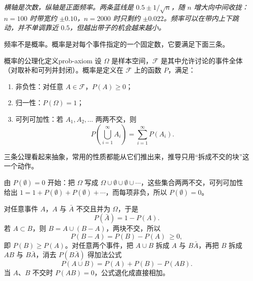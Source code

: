 \begin{center}
\par\vspace{2pt}
{\footnotesize\itshape 横轴是次数，纵轴是正面频率。两条蓝线是 $0.5\pm1/\sqrt n$，随 $n$ 增大向中间收拢：$n=100$ 时带宽约 $\pm0.10$，$n=2000$ 时只剩约 $\pm0.022$。频率可以在带内上下跳动，并不单调靠近 $0.5$，但越出带子的机会越来越小。}
\end{center}

频率不是概率。概率是对每个事件指定的一个固定数，它要满足下面三条。

\begin{mydef}{概率的公理化定义}{prob-axiom}
设 $\Omega$ 是样本空间，$\mathcal F$ 是其中允许讨论的事件全体（对取补和可列并封闭）。概率是定义在 $\mathcal F$ 上的函数 $P$，满足：
\begin{enumerate}[label=(\roman*),leftmargin=2.2em]
\item 非负性：对任意 $A\in\mathcal F$，$P(A)\ge 0$；
\item 归一性：$P(\Omega)=1$；
\item 可列可加性：若 $A_1,A_2,\dots$ 两两不交，则
\[
P\!\left(\bigcup_{i=1}^{\infty}A_i\right)=\sum_{i=1}^{\infty}P(A_i).
\]
\end{enumerate}
\end{mydef}

三条公理看起来抽象，常用的性质都能从它们推出来，推导只用“拆成不交的块”这一个动作。

由 $P(\emptyset)=0$ 开始：把 $\Omega$ 写成 $\Omega\cup\emptyset\cup\emptyset\cup\cdots$，这些集合两两不交，可列可加性给出 $1=1+P(\emptyset)+P(\emptyset)+\cdots$，而每项非负，所以 $P(\emptyset)=0$。

对任意事件 $A$，$A$ 与 $\bar A$ 不交且并为 $\Omega$，于是
\[
P(\bar A)=1-P(A).
\]
若 $A\subset B$，则 $B=A\cup(B-A)$，两块不交，所以
\[
P(B-A)=P(B)-P(A)\ \ge 0,
\]
即 $P(B)\ge P(A)$。对任意两个事件，把 $A\cup B$ 拆成 $A$ 与 $B\bar A$，再把 $B$ 拆成 $AB$ 与 $B\bar A$，消去 $P(B\bar A)$ 得加法公式
\[
P(A\cup B)=P(A)+P(B)-P(AB).
\]
当 $A$、$B$ 不交时 $P(AB)=0$，公式退化成直接相加。

